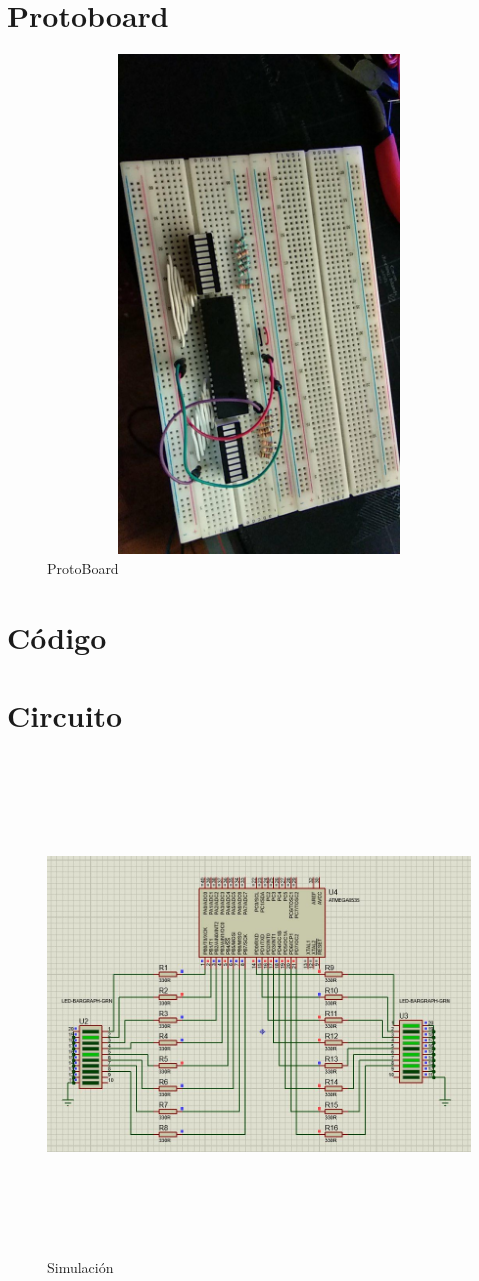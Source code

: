 \documentclass{article}
\begin{document}
\maketitle
\tableofcontents
\newpage
\section{Protoboard}
\begin{figure}[htpb!]
	\centering
	\caption{ProtoBoard}
	\includegraphics[height=500px, width=500px]{img/proto}
\end{figure}
\newpage
\section{Código}

\newpage
\section{Circuito}
\begin{figure}[htpb!]
	\centering
	\caption{Simulación}
	\includegraphics[height=500px, width=500px]{img/sym}
\end{figure}
\end{document}
